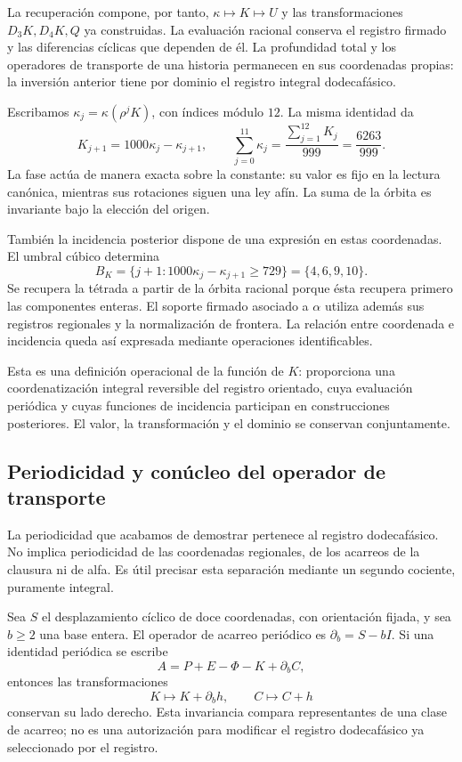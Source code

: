 La recuperación compone, por tanto, \(\kappa\mapsto K\mapsto U\)
y las transformaciones \(D_3K,D_4K,Q\) ya construidas. La evaluación
racional conserva el registro firmado y las diferencias cíclicas que
dependen de él. La profundidad total y los operadores de transporte de
una historia permanecen en sus coordenadas propias: la inversión anterior
tiene por dominio el registro integral dodecafásico.

Escribamos \(\kappa_j=\kappa(\rho^jK)\), con índices módulo \(12\).
La misma identidad da
\[
 K_{j+1}=1000\kappa_j-\kappa_{j+1},\qquad
 \sum_{j=0}^{11}\kappa_j=\frac{\sum_{j=1}^{12}K_j}{999}
 =\frac{6263}{999}.
\]
La fase actúa de manera exacta sobre la constante: su valor es fijo
en la lectura canónica, mientras sus rotaciones siguen una ley afín.
La suma de la órbita es invariante bajo la elección del origen.

También la incidencia posterior dispone de una expresión en estas
coordenadas. El umbral cúbico determina
\[
 B_K=\{j+1:1000\kappa_j-\kappa_{j+1}\ge729\}
 =\{4,6,9,10\}.
\]
Se recupera la tétrada a partir de la órbita racional porque ésta
recupera primero las componentes enteras. El soporte firmado asociado
a \(\alpha\) utiliza además sus registros regionales y la normalización
de frontera. La relación entre coordenada e incidencia queda así
expresada mediante operaciones identificables.

Esta es una definición operacional de la función de \(K\): proporciona
una coordenatización integral reversible del registro orientado, cuya
evaluación periódica y cuyas funciones de incidencia participan en
construcciones posteriores. El valor, la transformación y el dominio
se conservan conjuntamente.



\subsection{Periodicidad y conúcleo del operador de transporte}
\label{x_reciprocidad:subsec:k-clase-acarreo}

La periodicidad que acabamos de demostrar pertenece al registro dodecafásico. No implica
periodicidad de las coordenadas regionales, de los acarreos de la clausura
ni de alfa. Es útil precisar esta separación mediante un segundo
cociente, puramente integral.

Sea \(S\) el desplazamiento cíclico de doce coordenadas, con orientación
fijada, y sea \(b\geq2\) una base entera. El operador de acarreo
periódico es \(\partial_b=S-bI\). Si una identidad periódica se escribe
\[
 A=P+E-\Phi-K+\partial_bC,
\]
entonces las transformaciones
\[
 K\longmapsto K+\partial_bh,\qquad C\longmapsto C+h
\]
conservan su lado derecho. Esta invariancia compara representantes de una
clase de acarreo; no es una autorización para modificar el registro dodecafásico ya
seleccionado por el registro.

